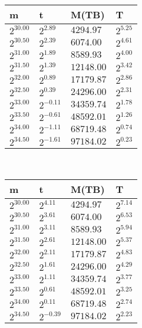 \begin{tabular}{llll}
m & t & M(TB) & T \\ \hline
$2^{30.00}$ & $2^{2.89}$ & $4294.97$ & $2^{5.25}$ \\
$2^{30.50}$ & $2^{2.39}$ & $6074.00$ & $2^{4.61}$ \\
$2^{31.00}$ & $2^{1.89}$ & $8589.93$ & $2^{4.00}$ \\
$2^{31.50}$ & $2^{1.39}$ & $12148.00$ & $2^{3.42}$ \\
$2^{32.00}$ & $2^{0.89}$ & $17179.87$ & $2^{2.86}$ \\
$2^{32.50}$ & $2^{0.39}$ & $24296.00$ & $2^{2.31}$ \\
$2^{33.00}$ & $2^{-0.11}$ & $34359.74$ & $2^{1.78}$ \\
$2^{33.50}$ & $2^{-0.61}$ & $48592.01$ & $2^{1.26}$ \\
$2^{34.00}$ & $2^{-1.11}$ & $68719.48$ & $2^{0.74}$ \\
$2^{34.50}$ & $2^{-1.61}$ & $97184.02$ & $2^{0.23}$ \\
\end{tabular}
 \ 
\begin{tabular}{llll}
m & t & M(TB) & T \\ \hline
$2^{30.00}$ & $2^{4.11}$ & $4294.97$ & $2^{7.14}$ \\
$2^{30.50}$ & $2^{3.61}$ & $6074.00$ & $2^{6.53}$ \\
$2^{31.00}$ & $2^{3.11}$ & $8589.93$ & $2^{5.94}$ \\
$2^{31.50}$ & $2^{2.61}$ & $12148.00$ & $2^{5.37}$ \\
$2^{32.00}$ & $2^{2.11}$ & $17179.87$ & $2^{4.83}$ \\
$2^{32.50}$ & $2^{1.61}$ & $24296.00$ & $2^{4.29}$ \\
$2^{33.00}$ & $2^{1.11}$ & $34359.74$ & $2^{3.77}$ \\
$2^{33.50}$ & $2^{0.61}$ & $48592.01$ & $2^{3.25}$ \\
$2^{34.00}$ & $2^{0.11}$ & $68719.48$ & $2^{2.74}$ \\
$2^{34.50}$ & $2^{-0.39}$ & $97184.02$ & $2^{2.23}$ \\
\end{tabular}
 \ 
